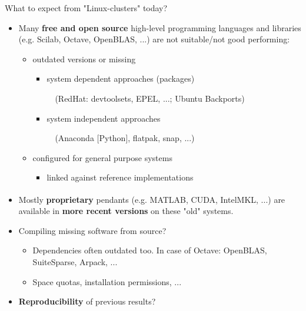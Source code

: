 \documentclass[xcolor=svgnames,xcolor=table,aspectratio=169]{beamer}
\newcommand{\regmark}{\textsuperscript{\tiny\textregistered}}
\begin{document}
\begin{frame}{What to expect from "Linux-clusters" today?}
\begin{itemize}
\itemsep1em
\item
Many \textbf{free and open source} high-level programming languages
and libraries (e.g. Scilab, Octave, OpenBLAS, ...)
are not suitable/not good performing:
\begin{itemize}
\item
outdated versions or missing
\begin{itemize}
\item
system dependent approaches (packages)

$\quad$(RedHat: devtoolsets, EPEL, ...; Ubuntu Backports)

\item
system independent approaches

$\quad$(Anaconda [Python], flatpak, snap, ...)
\end{itemize}
\item
configured for general purpose systems
\begin{itemize}
\item
linked against reference implementations
\end{itemize}
\end{itemize}
\item
Mostly \textbf{proprietary} pendants
(e.g. MATLAB\regmark, CUDA\regmark, Intel\regmark MKL, ...)
are available in \textbf{more recent versions} on these "old" systems.

\item
Compiling missing software from source?
\begin{itemize}
\item
Dependencies often outdated too.
In case of Octave: OpenBLAS, SuiteSparse, Arpack, ...

\item
Space quotas, installation permissions, ...
\end{itemize}

\item
\textbf{Reproducibility} of previous results?
\end{itemize}
\end{frame}
\end{document}
